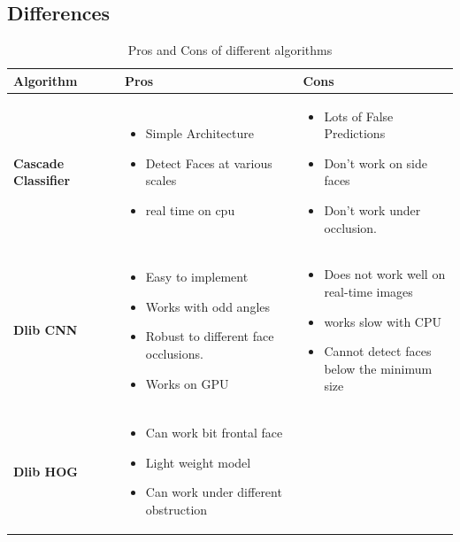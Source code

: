 \subsection{Differences}
\begin{table}[h]
    \centering
    \caption{Pros and Cons of different algorithms}
    \begin{tabular}{|p{0.25\linewidth}|p{0.4\linewidth}|p{0.4\linewidth}|}
    \textbf{Algorithm}
    & \textbf{Pros} & \textbf{Cons} \\
    \hline
    \textbf{Cascade Classifier} & 
    \begin{itemize}
    \item Simple Architecture
    \item Detect Faces at various scales
    \item real time on cpu
    \end{itemize}
    &
    \begin{itemize}
    \item Lots of False Predictions
    \item Don't work on side faces
    \item Don’t work under occlusion.
    \end{itemize} \\
    \hline
    \textbf{Dlib CNN} & 
    \begin{itemize}
    \item Easy to
    implement
    \item Works with odd angles
    \item Robust to different face occlusions.
    \item Works on GPU
    \end{itemize}
    &
    \begin{itemize}
    \item Does not work
    well on real-time
    images
    \item works slow with CPU
    \item  Cannot detect faces below the minimum size
    \end{itemize} \\
    \hline
    \textbf{Dlib HOG} & 
    \begin{itemize}
    \item Can work bit
    frontal face
    \item Light weight
    model
    \item Can work under different obstruction
    \end{itemize}
    &
    \begin{itemize}

\end{itemize}
\end{tabular}
\end{table}
